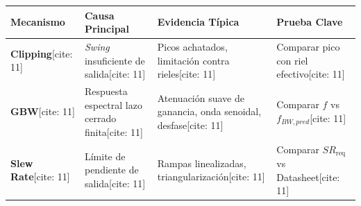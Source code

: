 \documentclass[11pt, a4paper]{article}
\begin{document}
\begin{table}[htbp]
    \centering
    \footnotesize
    \renewcommand{\arraystretch}{1.5}
    \begin{tabularx}{\textwidth}{|>{\raggedright\arraybackslash\hsize=0.8\hsize}X|>{\raggedright\arraybackslash\hsize=0.8\hsize}X|>{\raggedright\arraybackslash\hsize=1.4\hsize}X|>{\raggedright\arraybackslash\hsize=1.0\hsize}X|}
    \hline
    \rowcolor[HTML]{EFEFEF} 
    \textbf{Mecanismo} & \textbf{Causa Principal} & \textbf{Evidencia Típica} & \textbf{Prueba Clave} \\ \hline
    \textbf{Clipping}[cite: 11] & \textit{Swing} insuficiente de salida[cite: 11] & Picos achatados, limitación contra rieles[cite: 11] & Comparar pico con riel efectivo[cite: 11] \\ \hline
    \textbf{GBW}[cite: 11] & Respuesta espectral lazo cerrado finita[cite: 11] & Atenuación suave de ganancia, onda senoidal, desfase[cite: 11] & Comparar $f$ vs $f_{BW,pred}$[cite: 11] \\ \hline
    \textbf{Slew Rate}[cite: 11] & Límite de pendiente de salida[cite: 11] & Rampas linealizadas, triangularización[cite: 11] & Comparar $SR_{\mathrm{req}}$ vs Datasheet[cite: 11] \\ \hline
    \end{tabularx}
\end{table}
\end{document}
